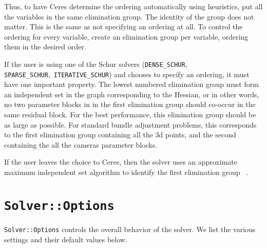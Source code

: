 Thus, to have Ceres determine the ordering automatically using
heuristics, put all the variables in the same elimination group. The
identity of the group does not matter. This is the same as not
specifying an ordering at all. To control the ordering for every
variable, create an elimination group per variable, ordering them in
the desired order.

If the user is using one of the Schur solvers (\texttt{DENSE\_SCHUR},
\texttt{SPARSE\_SCHUR},\ \texttt{ITERATIVE\_SCHUR}) and chooses to
specify an ordering, it must have one important property. The lowest
numbered elimination group must form an independent set in the graph
corresponding to the Hessian, or in other words, no two parameter
blocks in in the first elimination group should co-occur in the same
residual block. For the best performance, this elimination group
should be as large as possible. For standard bundle adjustment
problems, this corresponds to the first elimination group containing
all the 3d points, and the second containing the all the cameras
parameter blocks.

If the user leaves the choice to Ceres, then the solver uses an
approximate maximum independent set algorithm to identify the first
elimination group~\cite{li2007miqr} .
\section{\texttt{Solver::Options}}

\texttt{Solver::Options} controls the overall behavior of the
solver. We list the various settings and their default values below.

